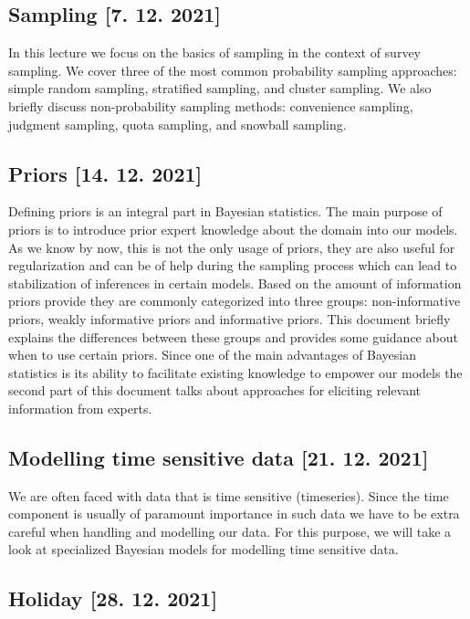 \documentclass[fleqn,moreauthors,10pt]{ds_report}
\begin{document}
\subsection*{Sampling [7. 12. 2021]}

In this lecture we focus on the basics of sampling in the context of survey sampling. We cover three of the most common probability sampling approaches: simple random sampling, stratified sampling, and cluster sampling. We also briefly discuss non-probability sampling methods: convenience sampling, judgment sampling, quota sampling, and snowball sampling.

\subsection*{Priors [14. 12. 2021]}

Defining priors is an integral part in Bayesian statistics. The main purpose of priors is to introduce prior expert knowledge about the domain into our models. As we know by now, this is not the only usage of priors, they are also useful for regularization and can be of help during the sampling process which can lead to stabilization of inferences in certain models. Based on the amount of information priors provide they are commonly categorized into three groups: non-informative priors, weakly informative priors and informative priors. This document briefly explains the differences between these groups and provides some guidance about when to use certain priors. Since one of the main advantages of Bayesian statistics is its ability to facilitate existing knowledge to empower our models the second part of this document talks about approaches for eliciting relevant information from experts.

\subsection*{Modelling time sensitive data [21. 12. 2021]}

We are often faced with data that is time sensitive (timeseries). Since the time component is usually of paramount importance in such data we have to be extra careful when handling and modelling our data. For this purpose, we will take a look at specialized Bayesian models for modelling time sensitive data.

\subsection*{Holiday [28. 12. 2021]}
\end{document}
